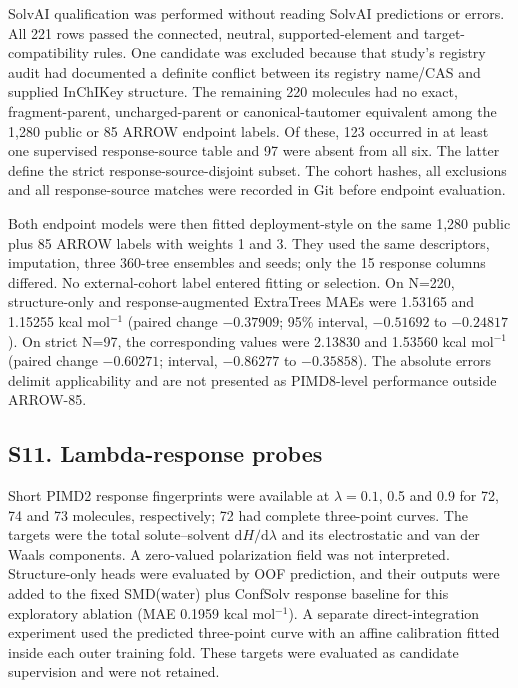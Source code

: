 SolvAI qualification was performed without reading SolvAI predictions or errors. All
221 rows passed the connected, neutral, supported-element and target-compatibility
rules. One candidate was excluded because that study's registry audit had documented a
definite conflict between its registry name/CAS and supplied InChIKey structure. The
remaining 220 molecules had no exact, fragment-parent, uncharged-parent or
canonical-tautomer equivalent among the 1,280 public or 85 ARROW endpoint labels.
Of these, 123 occurred in at least one supervised response-source table and 97 were
absent from all six. The latter define the strict response-source-disjoint subset.
The cohort hashes, all exclusions and all response-source matches were recorded in Git before
endpoint evaluation.

Both endpoint models were then fitted deployment-style on the same 1,280 public
plus 85 ARROW labels with weights 1 and 3. They used the same descriptors, imputation,
three 360-tree ensembles and seeds; only the 15 response columns differed. No external-cohort
label entered fitting or selection. On N=220, structure-only and response-augmented
ExtraTrees MAEs were
1.53165 and 1.15255 kcal mol$^{-1}$ (paired change $-0.37909$; 95\% interval,
$-0.51692$ to $-0.24817$). On strict N=97, the corresponding values were 2.13830 and
1.53560 kcal mol$^{-1}$ (paired change $-0.60271$; interval, $-0.86277$ to $-0.35858$).
The absolute errors delimit applicability and are not presented as PIMD8-level
performance outside ARROW-85.

\subsection*{S11. Lambda-response probes}

Short PIMD2 response fingerprints were available at $\lambda=0.1$, 0.5 and 0.9 for
72, 74 and 73 molecules, respectively; 72 had complete three-point curves. The
targets were the total solute--solvent $\mathrm{d}H/\mathrm{d}\lambda$ and its
electrostatic and van der Waals components. A zero-valued polarization field was not
interpreted. Structure-only heads were evaluated by OOF prediction, and their
outputs were added to the fixed SMD(water) plus ConfSolv response baseline for
this exploratory ablation (MAE 0.1959 kcal mol$^{-1}$). A separate direct-integration experiment used the predicted three-point
curve with an affine calibration fitted inside each outer training fold. These
targets were evaluated as candidate supervision and were not retained.

